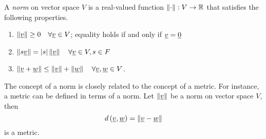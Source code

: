 A \emph{norm} on vector space $V$ is a real-valued function $\left\| \cdot \right\| : V \rightarrow \mathbb{R}$ that satisfies the following properties.
\begin{enumerate}
\item $\left\| \underline{v} \right\| \geq 0 \quad \forall \underline{v} \in V$;
equality holds if and only if $\underline{v} = \underline{0}$
\item $\left\| s \underline{v} \right\| = |s| \left\| \underline{v} \right\| \quad \forall \underline{v} \in V, s \in F$
\item $\left\| \underline{v} + \underline{w} \right\| \leq
\left\| \underline{v} \right\| + \left\| \underline{w} \right\| \quad \forall \underline{v}, \underline{w} \in V$.
\end{enumerate}

The concept of a norm is closely related to the concept of a metric.
For instance, a metric can be defined in terms of a norm.
Let $\left\| \underline{v} \right\|$ be a norm on vector space $V$, then
\begin{equation*}
d \left( \underline{v}, \underline{w} \right)
= \left\| \underline{v} - \underline{w} \right\|
\end{equation*}
is a metric.

